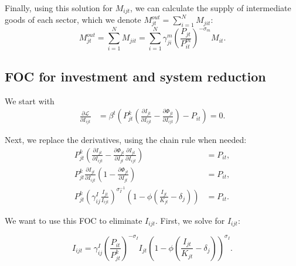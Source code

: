 Finally, using this solution for $M_{ijt}$, we can calculate the
supply of intermediate goods of each sector, which we denote $M_{jt}^{out}=\sum_{i=1}^{N}M_{jit}$:
\[
M_{jt}^{out}=\sum_{i=1}^{N}M_{jit}=\sum_{i=1}^{N}\gamma_{ji}^{m}\left(\frac{{P_{jt}}}{P_{it}^{m}}\right)^{-\sigma_{m}}M_{it}.
\]


\subsection{FOC for investment and system reduction}

We start with
\begin{align*}
\frac{\partial\mathcal{{L}}}{\partial I_{ijt}} & =\beta^{t}\left(P_{jt}^{k}\left(\frac{\partial I_{jt}}{\partial I_{ijt}}-\frac{\partial\Phi_{jt}}{\partial I_{ijt}}\right)-P_{it}\right)=0.
\end{align*}

Next, we replace the derivatives, using the chain rule when needed:
\begin{align*}
P_{jt}^{k}\left(\frac{\partial I_{jt}}{\partial I_{ijt}}-\frac{\partial\Phi_{jt}}{\partial I_{jt}}\frac{\partial I_{jt}}{\partial I_{ijt}}\right) & =P_{it},\\
P_{jt}^{k}\frac{\partial I_{jt}}{\partial I_{ijt}}\left(1-\frac{\partial\Phi_{jt}}{\partial I_{jt}}\right) & =P_{it},\\
P_{jt}^{k}\left(\gamma_{ij}^{I}\frac{{I_{jt}}}{I_{ijt}}\right)^{\sigma_{I}^{-1}}\left(1-\phi\left(\frac{I_{jt}}{K_{jt}}-\delta_{j}\right)\right) & =P_{it}.
\end{align*}

We want to use this FOC to eliminate $I_{ijt}$. First, we solve
for $I_{ijt}$:

\[
I_{ijt}=\gamma_{ij}^{I}\left(\frac{{P_{it}}}{P_{jt}^{k}}\right)^{-\sigma_{I}}I_{jt}\left(1-\phi\left(\frac{I_{jt}}{K_{jt}}-\delta_{j}\right)\right)^{\sigma_{I}}.
\]

